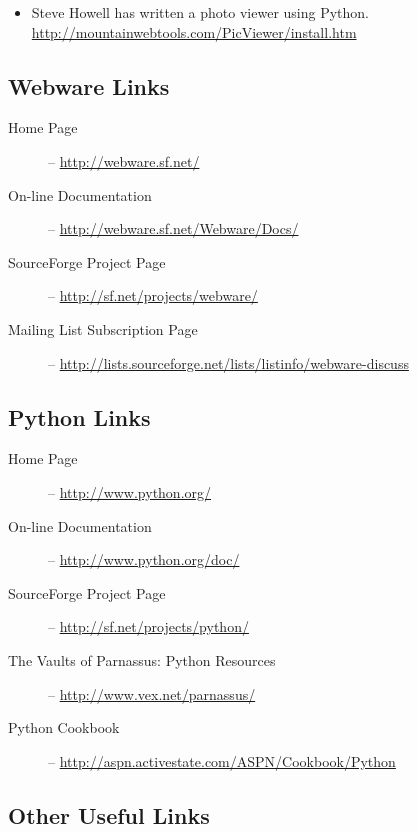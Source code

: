 \begin{itemize}
\item Steve Howell has written a photo viewer using Python.
     \url{http://mountainwebtools.com/PicViewer/install.htm}
\end{itemize}


\subsection{Webware Links}
\label{links.webware}

\begin{description}
\item[Home Page] -- \url{http://webware.sf.net/}
     
\item[On-line Documentation] -- \url{http://webware.sf.net/Webware/Docs/}
     
\item[SourceForge Project Page] -- \url{http://sf.net/projects/webware/}
     
\item[Mailing List Subscription Page] --
     \url{http://lists.sourceforge.net/lists/listinfo/webware-discuss}

\end{description}

\subsection{Python Links}
\label{links.python}

\begin{description}
\item[Home Page] -- \url{http://www.python.org/}
\item[On-line Documentation] -- \url{http://www.python.org/doc/}
\item[SourceForge Project Page] -- \url{http://sf.net/projects/python/}
\item[The Vaults of Parnassus: Python Resources] --
     \url{http://www.vex.net/parnassus/}
\item[Python Cookbook] -- \url{http://aspn.activestate.com/ASPN/Cookbook/Python}
\end{description}

\subsection{Other Useful Links}
\label{links.other}


